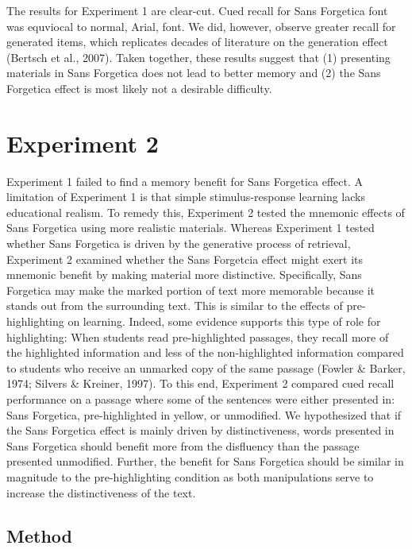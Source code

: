 \documentclass[english,doc]{apa6}
\begin{document}
The results for Experiment 1 are clear-cut. Cued recall for Sans Forgetica font was equviocal to normal, Arial, font. We did, however, observe greater recall for generated items, which replicates decades of literature on the generation effect (Bertsch et al., 2007). Taken together, these results suggest that (1) presenting materials in Sans Forgetica does not lead to better memory and (2) the Sans Forgetica effect is most likely not a desirable difficulty.

\hypertarget{experiment-2}{%
\section{Experiment 2}\label{experiment-2}}

Experiment 1 failed to find a memory benefit for Sans Forgetica effect. A limitation of Experiment 1 is that simple stimulus-response learning lacks educational realism. To remedy this, Experiment 2 tested the mnemonic effects of Sans Forgetica using more realistic materials. Whereas Experiment 1 tested whether Sans Forgetica is driven by the generative process of retrieval, Experiment 2 examined whether the Sans Forgetcia effect might exert its mnemonic benefit by making material more distinctive. Specifically, Sans Forgetica may make the marked portion of text more memorable because it stands out from the surrounding text. This is similar to the effects of pre-highlighting on learning. Indeed, some evidence supports this type of role for highlighting: When students read pre-highlighted passages, they recall more of the highlighted information and less of the non-highlighted information compared to students who receive an unmarked copy of the same passage (Fowler \& Barker, 1974; Silvers \& Kreiner, 1997). To this end, Experiment 2 compared cued recall performance on a passage where some of the sentences were either presented in: Sans Forgetica, pre-highlighted in yellow, or unmodified. We hypothesized that if the Sans Forgetica effect is mainly driven by distinctiveness, words presented in Sans Forgetica should benefit more from the disfluency than the passage presented unmodified. Further, the benefit for Sans Forgetica should be similar in magnitude to the pre-highlighting condition as both manipulations serve to increase the distinctiveness of the text.

\hypertarget{method-1}{%
\subsection{Method}\label{method-1}}
\end{document}
